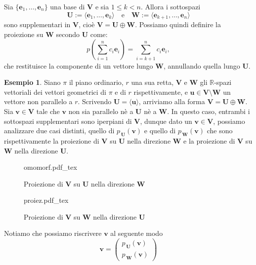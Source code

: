 \documentclass{article}
\theoremstyle{plain}
\theoremstyle{definition}
\newtheorem{exmp}{Esempio}[section]
\theoremstyle{remark}
\newcommand{\incfig}[2][\columnwidth]{%
    \def\svgwidth{#1}
    {#2.pdf_tex}
}
\begin{document}
Sia $\{\mathbf{e}_1,\dots,\mathbf{e}_n\}$ una base di $\mathbf{V}$ e sia $1\leq k<n$. Allora i sottospazi 
\[
\mathbf{U} := \langle \mathbf{e}_1,\dots,\mathbf{e}_k \rangle \quad \text{e} \quad \mathbf{W} := \langle \mathbf{e}_{k+1},\dots,\mathbf{e}_n \rangle
\]
sono supplementari in $\mathbf{V}$, cioè $\mathbf{V} = \mathbf{U} \oplus \mathbf{W}$. Possiamo quindi definire la proiezione su $\mathbf{W}$ secondo $\mathbf{U}$ come:
\[
p\left(\sum_{i=1}^{n}c_i\mathbf{e}_i\right) = \sum_{i=k+1}^{n}c_i\mathbf{e}_i,
\]
che restituisce la componente di un vettore lungo $\mathbf{W}$, annullando quella lungo $\mathbf{U}$.

\vspace{10pt}

\begin{exmp}
    Siano $\pi$ il piano ordinario, $r$ una sua retta, $\mathbf{V}$ e $\mathbf{W}$ gli $\mathbb{R}$-spazi vettoriali dei vettori geometrici di $\pi$ e di $r$ rispettivamente, e $\mathbf{u}\in\mathbf{V}\setminus\mathbf{W}$ un vettore non parallelo a $r$. 
    Scrivendo $\mathbf{U}=\langle\mathbf{u}\rangle$, arriviamo alla forma $\mathbf{V}=\mathbf{U}\oplus\mathbf{W}$.
    Sia $\mathbf{v}\in\mathbf{V}$ tale che $\mathbf{v}$ non sia parallelo nè a $\mathbf{U}$ nè a $\mathbf{W}$.
    In questo caso, entrambi i sottospazi supplementari sono iperpiani di $\mathbf{V}$, dunque dato un $\mathbf{v}\in\mathbf{V}$, possiamo analizzare due casi distinti, quello di $p_{\,\mathbf{U}}(\mathbf{v})$ e quello di $p_{\,\mathbf{W}}(\mathbf{v})$ che sono rispettivamente 
    la proiezione di $\mathbf{V}$ su $\mathbf{U}$ nella direzione $\mathbf{W}$ e la proiezione di $\mathbf{V}$ su $\mathbf{W}$ nella direzione $\mathbf{U}$.
    \begin{center}
    \begin{figure}[H]
        \centering
        \incfig[0.5\linewidth]{omomorf}
        \caption{Proiezione di $\mathbf{V}$ su $\mathbf{U}$ nella direzione $\mathbf{W}$}
    \end{figure}
    \begin{figure}[H]
        \centering
        \incfig[0.5\linewidth]{proiez}
        \caption{Proiezione di $\mathbf{V}$ su $\mathbf{W}$ nella direzione $\mathbf{U}$}
    \end{figure}    
    \end{center}
    Notiamo che possiamo riscrivere $\mathbf{v}$ al seguente modo 
    \[\mathbf{v}=\begin{pmatrix}
        p_{\,\mathbf{U}}(\mathbf{v})\\
        p_{\,\mathbf{W}}(\mathbf{v})
    \end{pmatrix}\]
\end{exmp}
\end{document}
